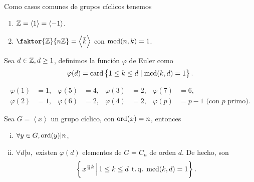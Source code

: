 \begin{example}
    Como casos comunes de grupos cíclicos tenemos
    \begin{enumerate}[1.]
        \item $\mathbb{Z} = \left< 1 \right> = \left< -1 \right>$.
        \item $\faktor{\z}{n\z} = \left< \bar{k} \right>$ con $\operatorname{mcd}(n, k) = 1$.
    \end{enumerate}
\end{example}

\begin{defi}
    Sea $d \in \mathbb{Z}, d \geq 1$, definimos la función $\varphi$ de Euler como
    \[
        \varphi(d) = \operatorname{card} \left\{ 1 \leq k \leq d \mid \operatorname{mcd}(k, d) = 1\right\}.
    \]
\end{defi}

\begin{example}
    \begin{align*}
        \varphi(1) &= 1, & \varphi(5) &= 4, & \varphi(3) &= 2, & \varphi(7) &= 6, \\
        \varphi(2) &= 1, & \varphi(6) &= 2, & \varphi(4) &= 2, & \varphi(p) &= p-1 \text{ (con } p \text{ primo).} 
    \end{align*}
\end{example}

\begin{prop}\label{prop:euler}
    Sea $G = \left< x \right>$ un grupo cíclico, con $\operatorname{ord}(x) = n$, entonces
    \begin{enumerate}[i)]
        \item $\forall y \in G, \operatorname{ord}(y) \vert n$,
        \item $\forall d \vert n,$ existen $\varphi(d)$ elementos de $G = C_n$ de orden $d$. De hecho, son
            \[
                \left\{\left. x^{\frac{n}{d} k} \,\right\vert 1 \leq k \leq d \operatorname{\;t.q.\;} \operatorname{mcd}(k, d) = 1\right\}.
            \]
    \end{enumerate}
\end{prop}

